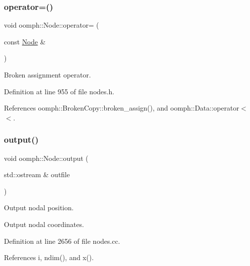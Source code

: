 \subsubsection{\texorpdfstring{operator=()}{operator=()}}
{\footnotesize\ttfamily void oomph\+::\+Node\+::operator= (\begin{DoxyParamCaption}\item[{const \hyperlink{classoomph_1_1Node}{Node} \&}]{ }\end{DoxyParamCaption})\hspace{0.3cm}{\ttfamily [inline]}}



Broken assignment operator. 



Definition at line 955 of file nodes.\+h.



References oomph\+::\+Broken\+Copy\+::broken\+\_\+assign(), and oomph\+::\+Data\+::operator$<$$<$.

\mbox{\label{classoomph_1_1Node_a8b65b015c5365f99de179cd893955e9a}} 
\subsubsection{\texorpdfstring{output()}{output()}}
{\footnotesize\ttfamily void oomph\+::\+Node\+::output (\begin{DoxyParamCaption}\item[{std\+::ostream \&}]{outfile }\end{DoxyParamCaption})}



Output nodal position. 

Output nodal coordinates. 

Definition at line 2656 of file nodes.\+cc.



References i, ndim(), and x().

\mbox{\label{classoomph_1_1Node_a6c287aa85c19f2d37ed7952ece5c76dd}} 
